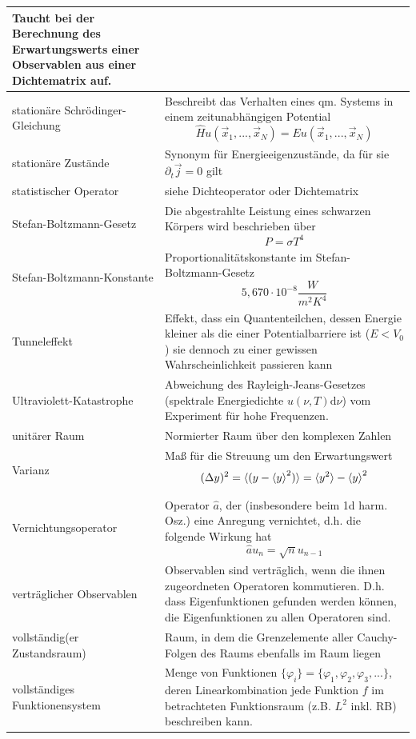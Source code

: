 \documentclass{article}
\newcommand{\diff}{\mathrm{d}}
\begin{document}
\begin{xltabular}{\linewidth}{l|X}
		\textcolor{gruen}{Taucht bei der Berechnung des Erwartungswerts einer Observablen aus einer Dichtematrix auf.}\\
	\hline
		stationäre Schrödinger-Gleichung & Beschreibt das Verhalten eines qm. Systems in einem zeitunabhängigen Potential
		$$\hat{H} u(\vec{x}_1,..., \vec{x}_N) = E u(\vec{x}_1,..., \vec{x}_N)$$ \\
	\hline
		stationäre Zustände & Synonym für Energieeigenzustände, da für sie $\partial_t \vec{j} = 0$ gilt \\
	\hline
		statistischer Operator & siehe Dichteoperator oder Dichtematrix \\
	\hline
		Stefan-Boltzmann-Gesetz & Die abgestrahlte Leistung eines schwarzen Körpers wird beschrieben über
			$$P = \sigma T^4$$ \\
	\hline
		Stefan-Boltzmann-Konstante & Proportionalitätskonstante im Stefan-Boltzmann-Gesetz
			$$5,670 \cdot 10^{-8}\frac{W}{m^2 K^4}$$ \\
	\hline
		Tunneleffekt & Effekt, dass ein Quantenteilchen, dessen Energie kleiner als die einer Potentialbarriere ist ($E<V_0$) sie dennoch zu einer gewissen Wahrscheinlichkeit passieren kann \\
	\hline
		Ultraviolett-Katastrophe & Abweichung des Rayleigh-Jeans-Gesetzes (spektrale Energiedichte $u(\nu,T)\diff\nu$) vom Experiment für hohe Frequenzen.\\
	\hline
		unitärer Raum & Normierter Raum über den komplexen Zahlen \\
	\hline
		Varianz & Maß für die Streuung um den Erwartungswert
			$$(\Delta y)^2 = \braket{(y - \braket{y}^2)} = \braket{y^2} - \braket{y}^2$$ \\
	\hline
		Vernichtungsoperator & Operator $\hat{a}$, der (insbesondere beim 1d harm. Osz.) eine Anregung vernichtet, d.h. die folgende Wirkung hat
			$$\hat{a}u_n = \sqrt{n} u_{n-1}$$\\
	\hline
		verträglicher Observablen & Observablen sind verträglich, wenn die ihnen zugeordneten Operatoren kommutieren. D.h. dass Eigenfunktionen gefunden werden können, die Eigenfunktionen zu allen Operatoren sind. \\
	\hline
		vollständig(er Zustandsraum) & Raum, in dem die Grenzelemente aller Cauchy-Folgen des Raums ebenfalls im Raum liegen \\
	\hline
		vollständiges Funktionensystem & Menge von Funktionen $\{\varphi_i\} = \{\varphi_1, \varphi_2, \varphi_3, ...\}$, deren Linearkombination jede Funktion $f$ im betrachteten Funktionsraum (z.B. $L^2$ inkl. RB) beschreiben kann.

\end{xltabular}
\end{document}
